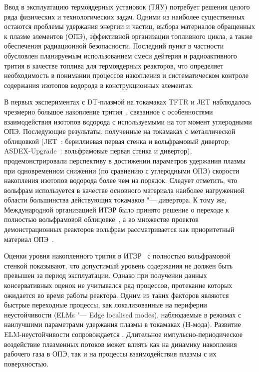 Ввод в эксплуатацию термоядерных установок (ТЯУ) потребует решения целого ряда физических и технологических задач. Одними из наиболее существенных остаются проблемы удержания энергии и частиц, выбора материалов обращенных к плазме элементов (ОПЭ), эффективной организации топливного цикла, а также обеспечения радиационной безопасности. Последний пункт в частности обусловлен планируемым использованием смеси дейтерия и радиоактивного трития в качестве топлива для термоядерных реакторов, что определяет необходимость в понимании процессов накопления и систематическом контроле содержания изотопов водорода в конструкционных элементах.

В первых экспериментах с DT-плазмой на токамаках TFTR и JET наблюдалось чрезмерно большое накопление трития~\cite{Gasparyan2024}, связанное с особенностями взаимодействия изотопов водорода с используемыми на тот момент углеродными ОПЭ. Последующие результаты, полученные на токамаках с металлической облицовкой (JET~\cite{Maggi2024,Kappatou2025}: бериллиевая первая стенка и вольфрамовый дивертор; ASDEX-Upgrade~\cite{Rohde2009}: вольфрамовые первая стенка и дивертор), продемонстрировали перспективу в достижении  параметров удержания плазмы при одновременном снижении (по сравнению с углеродными ОПЭ) скорости накопления изотопов водорода более чем на порядок. Следует отметить, что вольфрам используется в качестве основного материала наиболее нагруженной области большинства действующих токамаков "--- дивертора. К тому же, Международной организацией ИТЭР было принято решение о переходе к полностью вольфрамовой облицовке~\cite{Barabaschi2025}, а во множестве проектов демонстрационных реакторов вольфрам рассматривается как приоритетный материал ОПЭ~\cite{Bachmann2016}.

Оценки уровня накопленного трития в ИТЭР~\cite{Roth1,Pitts2025} с полностью вольфрамовой стенкой показывают, что допустимый уровень содержания не должен быть превышен за период эксплуатации. Однако при получении данных консервативных оценок не учитывался ряд процессов, протекание которых ожидается во время работы реактора. Одним из таких факторов являются быстрые переходные процессы, как локализованные на периферии неустойчивости (ELMs "--- Edge localised modes), наблюдаемые в режимах с наилучшими параметрами удержания плазмы в токамаках (H-мода). Развитие ELM-неустойчивости сопровождается . Длительное импульсно-периодическое воздействие плазменных потоков может влиять как на динамику накопления рабочего газа в ОПЭ, так и на процессы взаимодействия плазмы с их поверхностью.

